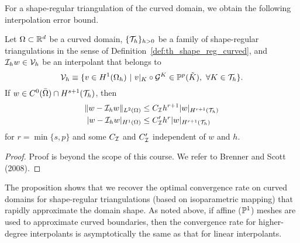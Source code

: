 For a shape-regular triangulation of the curved domain, we obtain the following interpolation error bound.
\begin{proposition}
  \label{prop:th_interp_gen_iso}
  Let $\Omega \subset \mathbb{R}^d$ be a curved domain, $\{\mathcal{T}_h\}_{h > 0}$ be a family of shape-regular triangulations in the sense of Definition~\ref{def:th_shape_reg_curved}, and $\mathcal{I}_h w \in \mathcal{V}_h$ be an interpolant that belongs to
  \begin{equation*}
    \calV_h \equiv \{ v \in H^1(\Omega_h) \ | \ v|_K \circ \calG^K \in \PP^p(\tilde K), \ \forall K \in \calT_h \}.
  \end{equation*}
  If $w \in C^0(\bar \Omega) \cap H^{s+1}(\mathcal{T}_h)$, then
\begin{align*}
  \| w - \mathcal{I}_h w \|_{L^2(\Omega)} &\leq C_{\mathcal{I}} h^{r+1} | w |_{H^{r+1}(\mathcal{T}_h)} \\
  | w - \mathcal{I}_h w |_{H^1(\Omega)} &\leq C'_{\mathcal{I}} h^{r} | w |_{H^{r+1}(\mathcal{T}_h)}
\end{align*}
for $r = \min\{ s,p \}$ and some $C_{\mathcal{I}}$ and $C_{\mathcal{I}}'$ independent of $w$ and $h$. 
\begin{proof}
  Proof is beyond the scope of this course. We refer to Brenner and Scott (2008).
\end{proof}
\end{proposition}
The proposition shows that we recover the optimal convergence rate on curved domains for shape-regular triangulations (based on isoparametric mapping) that rapidly approximate the domain shape.  As noted above, if affine ($\mathbb{P}^1$) meshes are used to approximate curved boundaries, then the convergence rate for higher-degree interpolants is asymptotically the same as that for linear interpolants.

